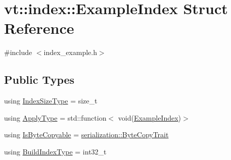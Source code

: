 \hypertarget{structvt_1_1index_1_1_example_index}{}\section{vt\+:\+:index\+:\+:Example\+Index Struct Reference}
\label{structvt_1_1index_1_1_example_index}


{\ttfamily \#include $<$index\+\_\+example.\+h$>$}

\subsection*{Public Types}
\begin{DoxyCompactItemize}
\item 
using \hyperlink{structvt_1_1index_1_1_example_index_a19740d27aa6a911ec99a6f19f8cfdaab}{Index\+Size\+Type} = size\+\_\+t
\item 
using \hyperlink{structvt_1_1index_1_1_example_index_a7a5993e2e55fb1f80f59daa65ab7ead4}{Apply\+Type} = std\+::function$<$ void(\hyperlink{structvt_1_1index_1_1_example_index}{Example\+Index})$>$
\item 
using \hyperlink{structvt_1_1index_1_1_example_index_ad880d8cf1bf3b66795a9b9c5ffd7a3eb}{Is\+Byte\+Copyable} = \hyperlink{structvt_1_1serialization_1_1_byte_copy_trait}{serialization\+::\+Byte\+Copy\+Trait}
\item 
using \hyperlink{structvt_1_1index_1_1_example_index_ad5d24fa38ed7adc651d0b1178b53e421}{Build\+Index\+Type} = int32\+\_\+t
\end{DoxyCompactItemize}
